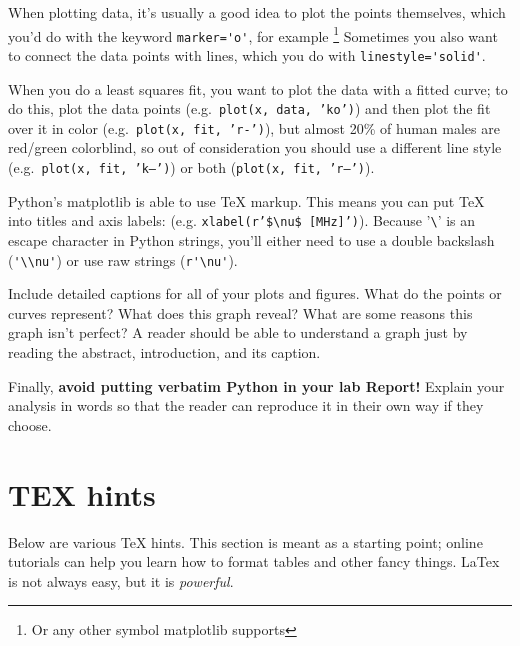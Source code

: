 \documentclass[12pt,preprint]{aastex}
\begin{document}
When plotting data, it's usually a good idea to plot the
  points themselves, which you'd do with the keyword \verb$marker='o'$, for
  example \footnote{Or any other symbol matplotlib supports}
    Sometimes you also want to connect the data points
  with lines, which you do with \verb$linestyle='solid'$.

When you do a least squares fit, you want to plot the
  data with a fitted curve; to do this, plot the data points
  (e.g.\ {\tt plot(x, data, 'ko')}) and then plot the fit over it
  in color (e.g.\ {\tt plot(x, fit, 'r-')}), but almost 20\% of human males are red/green
  colorblind, so out of consideration you should use a
  different line style (e.g.\ {\tt plot(x, fit, 'k--')}) or both
  ({\tt plot(x, fit, 'r--')}).


Python's matplotlib is able to use TeX markup.  This means you can put TeX into
titles and axis labels: (e.g. {\tt xlabel(r'\$\verb$\$nu\$ [MHz]')}).  Because '\verb$\$'
is an escape character in Python strings, you'll either need to use a double backslash (\verb$'\\nu'$)
or use raw strings (\verb$r'\nu'$).

Include detailed captions for all of your plots and figures. What do the points or curves represent? What does this graph reveal? What are some reasons this graph isn't perfect? A reader should be able to understand a graph just by reading the abstract, introduction, and its caption.

Finally, \textbf{avoid putting verbatim Python in your lab Report!} Explain your analysis in words so that the reader can reproduce it in their own way if they choose.

\section{TEX hints}

\noindent
Below are various TeX hints. This section is meant as a starting point; online tutorials can help you learn
how to format tables and other fancy things. LaTex is not always easy, but it is {\it powerful}.
\end{document}
